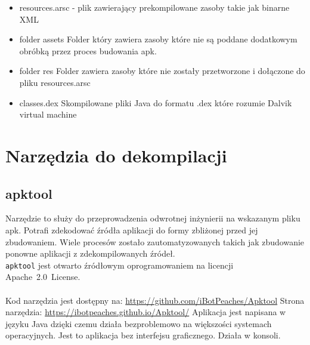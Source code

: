 \documentclass[12pt,a4paper,leqno,oneside,titlepage]{book}
\begin{document}
\begin{itemize}
\item resources.arsc - plik zawierający prekompilowane zasoby takie jak binarne XML

\item folder assets
Folder który zawiera zasoby które nie są poddane dodatkowym obróbką przez proces budowania apk.

\item folder res
Folder zawiera zasoby które nie zostały przetworzone i dołączone do pliku resources.arsc

\item classes.dex Skompilowane pliki Java do formatu .dex które rozumie Dalvik virtual machine

\end{itemize}


\chapter{Narzędzia do dekompilacji}

\section{apktool}

Narzędzie to służy do przeprowadzenia odwrotnej inżynierii na wskazanym pliku apk. Potrafi zdekodować źródła aplikacji do formy zbliżonej przed jej zbudowaniem. Wiele procesów zostało zautomatyzowanych takich jak zbudowanie ponowne aplikacji z zdekompilowanych źródeł. \\
\lstinline|apktool| jest otwarto źródłowym oprogramowaniem na licencji \mbox{Apache 2.0 License.} \\
\\
Kod narzędzia jest dostępny na: \url{https://github.com/iBotPeaches/Apktool} \newline
Strona narzędzia: \url{https://ibotpeaches.github.io/Apktool/}
\newline
\newline
Aplikacja jest napisana w języku Java dzięki czemu działa bezproblemowo na większości systemach operacyjnych. Jest to aplikacja bez interfejsu graficznego. Działa w konsoli.
\newline
\end{document}
